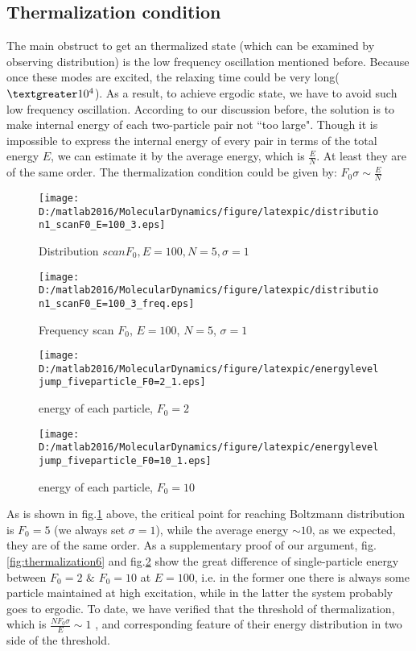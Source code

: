 \documentclass[aps,pre,twocolumn
,groupedaddress]{revtex4-1}
\begin{document}
\subsection{Thermalization condition}
The main obstruct to get an thermalized state (which can be examined by observing distribution) is the low frequency oscillation mentioned before. Because once these modes are excited, the relaxing time could be very long($\textgreater 10^4$). As a result, to achieve ergodic state, we have to avoid such low frequency oscillation. According to our discussion before, the solution is to make internal energy of each two-particle pair not ``too large". Though it is impossible to express the internal energy of every pair in terms of the total energy $E$, we can estimate it by the average energy, which is $\frac{E}{N}$. At least they are of the same order. The thermalization condition could be given by:
$F_0\sigma\sim\frac{E}{N}$


\begin{figure}[hbtp]
\centering
\texttt{[image: D:/matlab2016/MolecularDynamics/figure/latexpic/distribution1\_scanF0\_E=100\_3.eps]}
\caption{Distribution $scan F_0, E=100, N=5, \sigma=1$}
\label{fig:thermalization5}
\texttt{[image: D:/matlab2016/MolecularDynamics/figure/latexpic/distribution1\_scanF0\_E=100\_3\_freq.eps]}
\caption{Frequency scan $F_0$, $E=100$, $N=5$, $\sigma=1$}

\end{figure}




\begin{figure}
\centering
\texttt{[image: D:/matlab2016/MolecularDynamics/figure/latexpic/energyleveljump\_fiveparticle\_F0=2\_1.eps]}
\caption{energy of each particle, $F_0=2$}
\label{fig:thermalization6}

\centering
\texttt{[image: D:/matlab2016/MolecularDynamics/figure/latexpic/energyleveljump\_fiveparticle\_F0=10\_1.eps]}
\caption{energy of each particle, $F_0=10$}
\label{fig:thermalization7}
\end{figure}

As is shown in fig.\ref{fig:thermalization5} above, the critical point for reaching Boltzmann distribution is $F_0=5$ (we always set $\sigma=1$), while the average energy $\sim 10$, as we expected, they are of the same order. As a supplementary proof of our argument, fig.\ref{fig:thermalization6} and fig.\ref{fig:thermalization7} show the great difference of single-particle energy between $F_0=2$ $\&$ $F_0=10$ at $E=100$, i.e. in the former one there is always some particle maintained at high excitation, while in the latter the system probably goes to ergodic. To date, we have verified that the threshold of thermalization, which is $\frac{NF_0\sigma}{E}\sim1 $ , and corresponding feature of their energy distribution in two side of the threshold.
 
\end{document}
